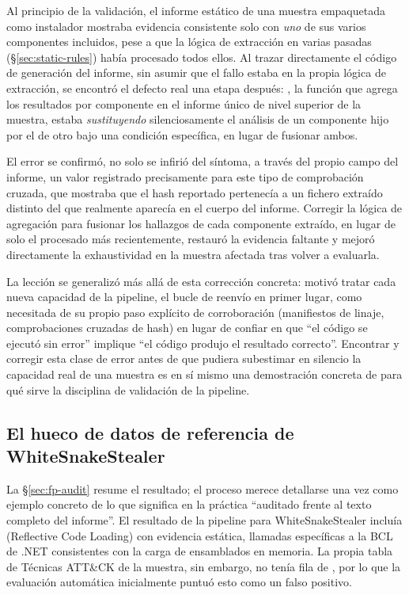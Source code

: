 Al principio de la validaci\'on, el informe est\'atico de una muestra
empaquetada como instalador mostraba evidencia consistente solo con
\emph{uno} de sus varios componentes incluidos, pese a que la
l\'ogica de extracci\'on en varias pasadas (\S\ref{sec:static-rules})
hab\'ia procesado todos ellos. Al trazar directamente el c\'odigo de
generaci\'on del informe, sin asumir que el fallo estaba en la propia
l\'ogica de extracci\'on, se encontr\'o el defecto real una etapa
despu\'es: , la funci\'on que agrega los
resultados por componente en el informe \'unico de nivel superior de
la muestra, estaba \emph{sustituyendo} silenciosamente el an\'alisis de
un componente hijo por el de otro bajo una condici\'on espec\'ifica, en
lugar de fusionar ambos.

El error se confirm\'o, no solo se infiri\'o del s\'intoma, a trav\'es
del propio campo  del informe, un valor registrado
precisamente para este tipo de comprobaci\'on cruzada, que mostraba que
el hash reportado pertenec\'ia a un fichero extra\'ido distinto del que
realmente aparec\'ia en el cuerpo del informe. Corregir la l\'ogica de
agregaci\'on para fusionar los hallazgos de cada componente extra\'ido,
en lugar de solo el procesado m\'as recientemente, restaur\'o la
evidencia faltante y mejor\'o directamente la exhaustividad en la
muestra afectada tras volver a evaluarla.

La lecci\'on se generaliz\'o m\'as all\'a de esta correcci\'on
concreta: motiv\'o tratar cada nueva capacidad de la pipeline, el
bucle de reenv\'io en primer lugar, como necesitada de su propio paso
expl\'icito de corroboraci\'on (manifiestos de linaje, comprobaciones
cruzadas de hash) en lugar de confiar en que ``el c\'odigo se
ejecut\'o sin error'' implique ``el c\'odigo produjo el resultado
correcto''. Encontrar y corregir esta clase de error antes de que
pudiera subestimar en silencio la capacidad real de una muestra es en
s\'i mismo una demostraci\'on concreta de para qu\'e sirve la
disciplina de validaci\'on de la pipeline.

\subsection{El hueco de datos de referencia de WhiteSnakeStealer}
\label{sec:case-wsnake}

La \S\ref{sec:fp-audit} resume el resultado; el proceso merece
detallarse una vez como ejemplo concreto de lo que significa en la
pr\'actica ``auditado frente al texto completo del informe''. El
resultado de la pipeline para WhiteSnakeStealer inclu\'ia
 (Reflective Code Loading) con evidencia est\'atica,
llamadas espec\'ificas a la BCL de .NET consistentes con la carga de
ensamblados en memoria. La propia tabla de T\'ecnicas ATT\&CK de la
muestra, sin embargo, no ten\'ia fila de , por lo que
la evaluaci\'on autom\'atica inicialmente puntu\'o esto como un falso
positivo.

